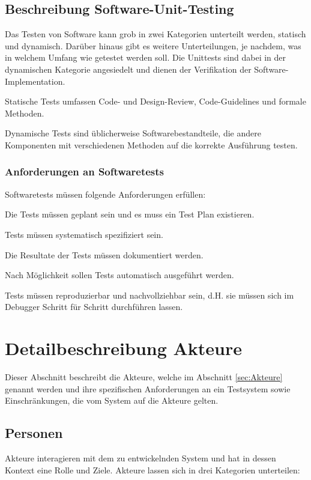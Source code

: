 \documentclass[
	ngerman,
	toc=listof, %
	toc=bibliography, %
	footnotes=multiple, %
	parskip=half, %
	numbers=noendperiod %
]{scrartcl}
\begin{document}
	\subsection{Beschreibung Software-Unit-Testing}
	Das Testen von Software kann grob in zwei Kategorien unterteilt werden, statisch und dynamisch. 
	Darüber hinaus gibt es weitere Unterteilungen, je nachdem, was in welchem Umfang wie getestet werden soll. Die Unittests sind dabei in der dynamischen Kategorie angesiedelt und dienen der Verifikation der Software-Implementation.

	Statische Tests umfassen Code- und Design-Review, Code-Guidelines und formale Methoden.

	Dynamische Tests sind üblicherweise Softwarebestandteile, die andere Komponenten mit verschiedenen Methoden auf die korrekte Ausführung testen. 

		\subsubsection{Anforderungen an Softwaretests}
		Softwaretests müssen folgende Anforderungen erfüllen:

		Die Tests müssen geplant sein und es muss ein Test Plan existieren.

		Tests müssen systematisch spezifiziert sein.

		Die Resultate der Tests müssen dokumentiert werden.

		Nach Möglichkeit sollen Tests automatisch ausgeführt werden.

		Tests müssen reproduzierbar und nachvollziehbar sein, d.H. sie müssen sich im Debugger Schritt für Schritt durchführen lassen.
			
\section{Detailbeschreibung Akteure}
Dieser Abschnitt beschreibt die Akteure, welche im Abschnitt \ref{sec:Akteure} genannt werden und ihre spezifischen Anforderungen an ein Testsystem sowie Einschränkungen, die vom System auf die Akteure gelten.
	
	\subsection{Personen}
	Akteure interagieren mit dem zu entwickelnden System und hat in dessen Kontext eine Rolle und Ziele.
	Akteure lassen sich in drei Kategorien unterteilen: 
		
\end{document}
